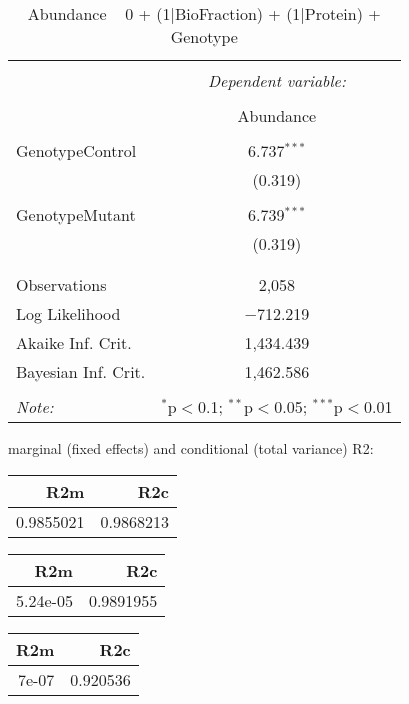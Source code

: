 \documentclass[11pt]{report}
\begin{document}
\begin{table}[!htbp] \centering 
  \caption{Abundance ~ 0 + (1|BioFraction) + (1|Protein) + Genotype} 
  \label{} 
\begin{tabular}{@{\extracolsep{5pt}}lc} 
\\[-1.8ex]\hline 
\hline \\[-1.8ex] 
 & \multicolumn{1}{c}{\textit{Dependent variable:}} \\ 
\cline{2-2} 
\\[-1.8ex] & Abundance \\ 
\hline \\[-1.8ex] 
 GenotypeControl & 6.737$^{***}$ \\ 
  & (0.319) \\ 
  & \\ 
 GenotypeMutant & 6.739$^{***}$ \\ 
  & (0.319) \\ 
  & \\ 
\hline \\[-1.8ex] 
Observations & 2,058 \\ 
Log Likelihood & $-$712.219 \\ 
Akaike Inf. Crit. & 1,434.439 \\ 
Bayesian Inf. Crit. & 1,462.586 \\ 
\hline 
\hline \\[-1.8ex] 
\textit{Note:}  & \multicolumn{1}{r}{$^{*}$p$<$0.1; $^{**}$p$<$0.05; $^{***}$p$<$0.01} \\ 
\end{tabular} 
\end{table} 
marginal (fixed effects) and conditional (total variance) R2:

\begin{tabular}{r|r}
\hline
R2m & R2c\\
\hline
0.9855021 & 0.9868213\\
\hline
\end{tabular}

\begin{tabular}{r|r}
\hline
R2m & R2c\\
\hline
5.24e-05 & 0.9891955\\
\hline
\end{tabular}

\begin{tabular}{r|r}
\hline
R2m & R2c\\
\hline
7e-07 & 0.920536\\
\hline
\end{tabular}
\end{document}
